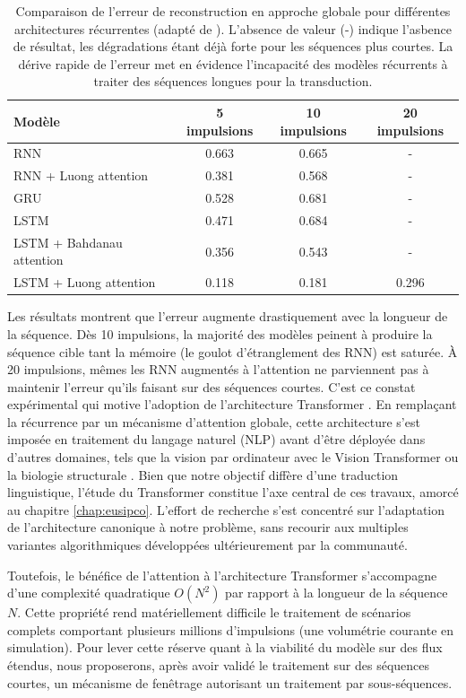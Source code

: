 \begin{table}[htbp]
\centering
\begin{tabular}{l c c c}
\toprule
\textbf{Modèle} & \textbf{5 impulsions} & \textbf{10 impulsions} & \textbf{20 impulsions} \\
\midrule
RNN & 0.663 & 0.665 & - \\
RNN + Luong attention & 0.381 & 0.568 & - \\
GRU & 0.528 & 0.681 & - \\
LSTM & 0.471 & 0.684 & - \\
LSTM + Bahdanau attention & 0.356 & 0.543 & - \\
LSTM + Luong attention & 0.118 & 0.181 & 0.296 \\
\bottomrule
\end{tabular}
\caption{Comparaison de l'erreur de reconstruction en approche globale pour différentes architectures récurrentes (adapté de \cite{manon_eusip}). L'absence de valeur (-) indique l'asbence de résultat, les dégradations étant déjà forte pour les séquences plus courtes. La dérive rapide de l'erreur met en évidence l'incapacité des modèles récurrents à traiter des séquences longues pour la transduction.}
\label{tab:RNNseq2seq}
\end{table}

Les résultats montrent que l'erreur augmente drastiquement avec la longueur de la séquence. Dès 10 impulsions, la majorité des modèles peinent à produire la séquence cible tant la mémoire (le goulot d'étranglement des RNN) est saturée. À 20 impulsions, mêmes les RNN augmentés à l'attention ne parviennent pas à maintenir l'erreur  qu'ils faisant sur des séquences courtes. C'est ce constat expérimental qui motive l'adoption de l'architecture Transformer \cite{vaswani_attention_2017}. En remplaçant la récurrence par un mécanisme d'attention globale, cette architecture s'est imposée en traitement du langage naturel (NLP) avant d'être déployée dans d'autres domaines, tels que la vision par ordinateur avec le Vision Transformer \cite{dosovitskiy_image_2020} ou la biologie structurale \cite{jumper_highly_2021}. Bien que notre objectif diffère d'une traduction linguistique, l'étude du Transformer constitue l'axe central de ces travaux, amorcé au chapitre \ref{chap:eusipco}. L'effort de recherche s'est concentré sur l'adaptation de l'architecture canonique à notre problème, sans recourir aux multiples variantes algorithmiques développées ultérieurement par la communauté.

Toutefois, le bénéfice de l'attention à l'architecture Transformer s'accompagne d'une complexité quadratique $O(N^2)$ par rapport à la longueur de la séquence $N$. Cette propriété rend matériellement difficile le traitement de scénarios complets comportant plusieurs millions d'impulsions (une volumétrie courante en simulation). Pour lever cette réserve quant à la viabilité du modèle sur des flux étendus, nous proposerons, après avoir validé le traitement sur des séquences courtes, un mécanisme de fenêtrage autorisant un traitement par sous-séquences.

